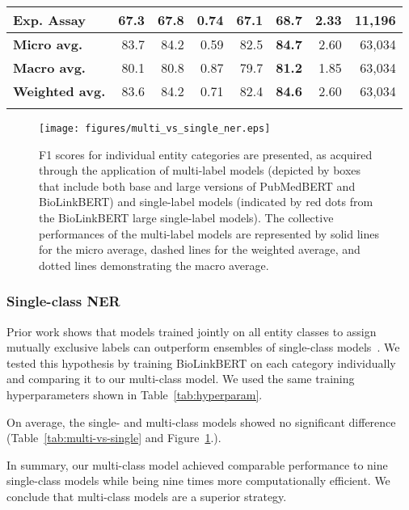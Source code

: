 \documentclass{bioinfo}
\begin{document}
\begin{table}[]
{\begin{tabular}{@{}l|rrr|rrr|r@{}}
Exp. Assay             & 67.3 & 67.8          & 0.74 & 67.1          & \textbf{68.7} & 2.33  & 11,196 \\\midrule
\textbf{Micro avg.}    & 83.7 & 84.2          & 0.59 & 82.5          & \textbf{84.7} & 2.60  & 63,034 \\ 
\textbf{Macro avg.}    & 80.1 & 80.8          & 0.87 & 79.7          & \textbf{81.2} & 1.85  & 63,034 \\
\textbf{Weighted avg.} & 83.6 & 84.2          & 0.71 & 82.4          & \textbf{84.6} & 2.60  & 63,034  \\\botrule
\end{tabular}
}{}
\end{table}

\begin{figure}\centering
\texttt{[image: figures/multi\_vs\_single\_ner.eps]}
\caption{F1 scores for individual entity categories are presented, as acquired through the application of multi-label models (depicted by boxes that include both base and large versions of PubMedBERT and BioLinkBERT) and single-label models (indicated by red dots from the BioLinkBERT large single-label models). The collective performances of the multi-label models are represented by solid lines for the micro average, dashed lines for the weighted average, and dotted lines demonstrating the macro average.}
\label{fig:multi-vs-single}
\end{figure}

\subsubsection{Single-class NER}\label{sec:single-class}

Prior work shows that models trained jointly on all entity classes to assign mutually exclusive labels can outperform ensembles of single-class models~\citep[e.g.,][]{mtbioner, Tong2021AMA}. We tested this hypothesis by training BioLinkBERT on each category individually and comparing it to our multi-class model. We used the same training hyperparameters shown in Table~\ref{tab:hyperparam}.

On average, the single- and multi-class models showed no significant difference (Table~\ref{tab:multi-vs-single} and Figure~\ref{fig:multi-vs-single}.).

In summary, our multi-class model achieved comparable performance to nine single-class models while being nine times more computationally efficient. We conclude that multi-class models are a superior strategy.
\end{document}

